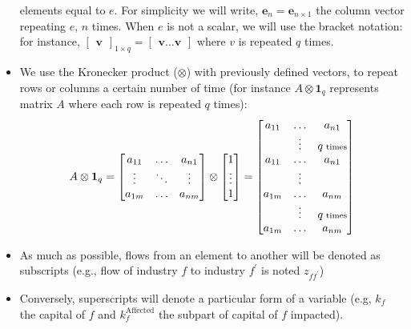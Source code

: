 \begin{itemize}
  elements equal to $e$. For simplicity we will write, $\bm{e}_n = \bm{e}_{n
    \times 1}$ the column vector repeating $e$, $n$ times. When $e$ is not a
  scalar, we will use the bracket notation: for
  instance, $\begin{bmatrix}\bm{v}\end{bmatrix}_{1 \times q}
  = \begin{bmatrix}\bm{v} \hdots \bm{v}  \end{bmatrix}$ where $v$ is repeated $q$ times.
\item We use the Kronecker product ($\otimes$) with previously defined vectors,
  to repeat rows or columns a certain number of time (for instance
  $A \otimes \bm{1}_q$ represents matrix $A$
  where each row is repeated $q$ times):
  \[
    A \otimes \bm{1}_q =
    \begin{bmatrix}
      a_{11} & \hdots & a_{n1} \\
      \vdots & \ddots & \vdots \\
      a_{1m} & \hdots & a_{nm} \\
    \end{bmatrix}
    \otimes
    \begin{bmatrix}
      1\\
      \vdots\\
      1
    \end{bmatrix} =
    \begin{bmatrix}
      a_{11} & \hdots & a_{n1} \\
             & \vdots  & q\textrm{\scriptsize{} times} \\
      a_{11} & \hdots & a_{n1} \\
             & \vdots & \\
      a_{1m} & \hdots & a_{nm} \\
             & \vdots & q\textrm{\scriptsize{} times} \\
      a_{1m} & \hdots & a_{nm}
    \end{bmatrix}
  \]
\item As much as possible, flows from an element to another will be denoted as
  subscripts (e.g., flow of industry $f$ to industry $f^{\prime}$ is noted
  $z_{ff^{\prime}}$)
\item Conversely, superscripts will denote a particular form of a variable (e.g,
  $k_f$ the capital of $f$ and $k_f^{\textrm{Affected}}$ the subpart of capital
  of $f$ impacted).
\end{itemize}

